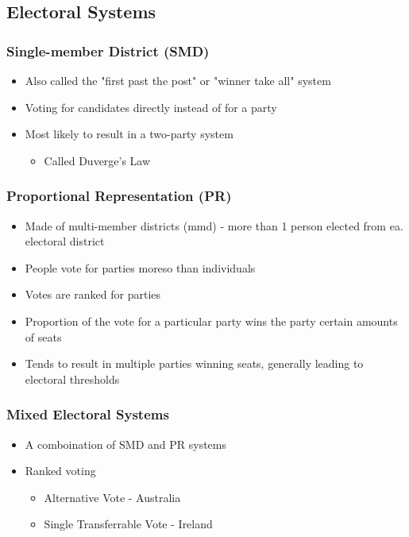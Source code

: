 \documentclass[11pt]{article}
\begin{document}
\subsection{Electoral Systems}
\label{sec:org313a1a8}
\subsubsection{Single-member District (SMD)}
\label{sec:org65aa93d}
\begin{itemize}
\item Also called the "first past the post" or "winner take all" system
\item Voting for candidates directly instead of for a party
\item Most likely to result in a two-party system
\begin{itemize}
\item Called Duverge's Law
\end{itemize}
\end{itemize}
\subsubsection{Proportional Representation (PR)}
\label{sec:org630c789}
\begin{itemize}
\item Made of multi-member districts (mmd) - more than 1 person elected from ea. electoral district
\item People vote for parties moreso than individuals
\item Votes are ranked for parties
\item Proportion of the vote for a particular party wins the party certain amounts of seats
\item Tends to result in multiple parties winning seats, generally leading to electoral thresholds
\end{itemize}
\subsubsection{Mixed Electoral Systems}
\label{sec:org18ac8a4}
\begin{itemize}
\item A comboination of SMD and PR systems
\item Ranked voting
\begin{itemize}
\item Alternative Vote - Australia
\item Single Transferrable Vote - Ireland
\end{itemize}
\end{itemize}
\end{document}
